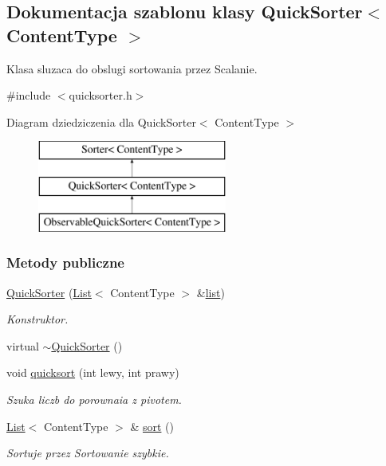 \hypertarget{class_quick_sorter}{\subsection{Dokumentacja szablonu klasy Quick\-Sorter$<$ Content\-Type $>$}
\label{class_quick_sorter}
}


Klasa sluzaca do obslugi sortowania przez Scalanie.  




{\ttfamily \#include $<$quicksorter.\-h$>$}

Diagram dziedziczenia dla Quick\-Sorter$<$ Content\-Type $>$\begin{figure}[H]
\begin{center}
\leavevmode
\includegraphics[height=3.000000cm]{class_quick_sorter}
\end{center}
\end{figure}
\subsubsection*{Metody publiczne}
\begin{DoxyCompactItemize}
\item 
\hyperlink{class_quick_sorter_a7a51572ed79a0c8e17bb4eb3f49a5a28}{Quick\-Sorter} (\hyperlink{class_list}{List}$<$ Content\-Type $>$ \&\hyperlink{class_quick_sorter_a66cd768b6d8a77952f004be7aad87a0e}{list})
\begin{DoxyCompactList}\small\item\em Konstruktor. \end{DoxyCompactList}\item 
virtual \hyperlink{class_quick_sorter_a485f3a798961c95288d6ca911615042e}{$\sim$\-Quick\-Sorter} ()
\item 
void \hyperlink{class_quick_sorter_a99641193667f65f8a203b65fdc0b4d92}{quicksort} (int lewy, int prawy)
\begin{DoxyCompactList}\small\item\em Szuka liczb do porownaia z pivotem. \end{DoxyCompactList}\item 
\hyperlink{class_list}{List}$<$ Content\-Type $>$ \& \hyperlink{class_quick_sorter_a86cadfe5f5b9fbdf6e9eacb0b7dbc83d}{sort} ()
\begin{DoxyCompactList}\small\item\em Sortuje przez Sortowanie szybkie. \end{DoxyCompactList}\end{DoxyCompactItemize}
